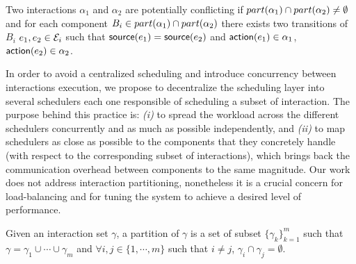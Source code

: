 \begin{definition}\label{def:pconf}
  Two interactions $\alpha_1$ and $\alpha_2$ are potentially conflicting if 
  $part(\alpha_1)\cap part(\alpha_2)\neq\emptyset$ and for each component $B_i\in part(\alpha_1)\cap
  part(\alpha_2)$ there exists two transitions of $B_i$ 
  $e_1,e_2\in\mathcal{E}_i$ such that $\textsf{source}(e_1)=\textsf{source}(e_2)$ and $\textsf{action}(e_1)\in\alpha_1$,
  $\textsf{action}(e_2)\in\alpha_2$.
\end{definition}


In order to avoid a centralized scheduling and introduce concurrency between interactions
execution, we propose to decentralize the scheduling layer into several schedulers each one
responsible of scheduling a subset of interaction. The purpose behind this practice is: 
\emph{(i)} to spread the workload across the different schedulers concurrently and
as much as possible independently, and \emph{(ii)} to map schedulers as close as possible to 
the components that they concretely handle (with respect to the corresponding subset of 
interactions), which brings back the communication overhead between components to the same 
magnitude. Our work does not address interaction partitioning, nonetheless it is a crucial 
concern for load-balancing and for tuning the system to achieve a desired level of performance. 

\begin{definition}
  Given an interaction set $\gamma$, a partition of $\gamma$ is a set of subset 
  $\{\gamma_k\}_{k=1}^m$ such that $\gamma=\gamma_1\cup\cdots\cup\gamma_m$ and 
  $\forall i,j\in\{1,\cdots,m\}$ such that $i\neq j$, $\gamma_i\cap\gamma_j=\emptyset$.
\end{definition}

